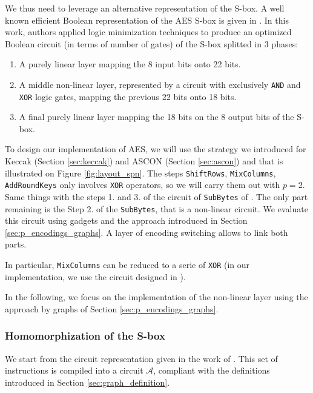 We thus need to leverage an alternative representation of the S-box. A well known efficient Boolean representation of the \gls{AES} S-box is given in \cite{boyar}. In this work, authors applied logic minimization techniques to produce an optimized Boolean circuit (in terms of number of gates) of the S-box splitted in 3 phases:

\begin{enumerate}
    \item A purely linear layer mapping the 8 input bits onto 22 bits.
    \item A middle non-linear layer, represented by a circuit with exclusively \texttt{AND} and \texttt{XOR} logic gates, mapping the previous 22 bits onto 18 bits.
    \item A final purely linear layer mapping the 18 bits on the 8 output bits of the S-box.
\end{enumerate}


To design our implementation of \gls{AES}, we will use the strategy we introduced for Keccak (Section \ref{sec:keccak}) and ASCON (Section \ref{sec:ascon}) and that is illustrated on Figure \ref{fig:layout_spn}. The steps \texttt{ShiftRows}, \texttt{MixColumns}, \texttt{AddRoundKeys} only involves \texttt{XOR} operators, so we will carry them out with $p=2$. Same things with the steps 1. and 3. of the circuit of \texttt{SubBytes} of \cite{boyar}. The only part remaining is the Step 2. of the \texttt{SubBytes}, that is a non-linear circuit. We evaluate this circuit using gadgets and the approach introduced in Section \ref{sec:p_encodings_graphs}. A layer of encoding switching allows to link both parts.

 In particular, \texttt{MixColumns} can be reduced to a serie of \texttt{XOR} (in our implementation, we use the circuit designed in \cite{EPRINT:Maximov19}). 

In the following, we focus on the implementation of the non-linear layer using the approach by graphs of Section \ref{sec:p_encodings_graphs}.


\subsubsection{Homomorphization of the S-box}


We start from the circuit representation given in the work of \cite{boyar}. This set of instructions is compiled into a circuit $\mathcal{A}$, compliant with the definitions introduced in Section \ref{sec:graph_definition}.


